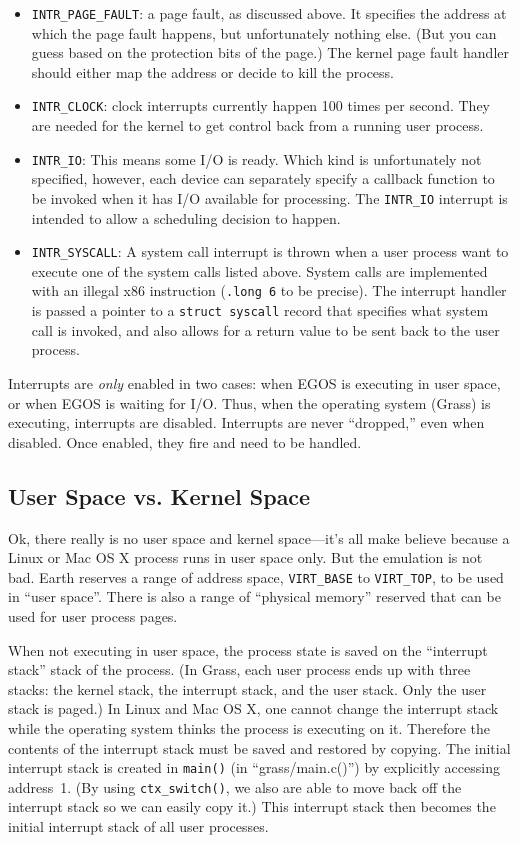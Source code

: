 \documentclass{article}
\begin{document}
\begin{itemize}
\item \texttt{INTR\_PAGE\_FAULT}: a page fault, as discussed above.
It specifies the address at which the page fault happens, but
unfortunately nothing else.  (But you can guess based on the protection
bits of the page.)  The kernel page fault handler should either
map the address or decide to kill the process.
\item \texttt{INTR\_CLOCK}: clock interrupts currently happen 100 times
per second.  They are needed for the kernel to get control back from
a running user process.
\item \texttt{INTR\_IO}:
This means some I/O is ready.  Which kind is unfortunately not specified,
however, each device can separately specify a callback function to be invoked
when it has I/O available for processing.  The \texttt{INTR\_IO} interrupt is
intended to allow a scheduling decision to happen.
\item \texttt{INTR\_SYSCALL}:
A system call interrupt is thrown when a user process want to execute
one of the system calls listed above.  System calls are implemented with
an illegal x86 instruction (\texttt{.long 6} to be precise).  The interrupt
handler is passed a pointer to a \texttt{struct syscall} record that
specifies what system call is invoked, and also allows for a return value
to be sent back to the user process.
\end{itemize}

Interrupts are \emph{only} enabled in two cases: when EGOS is executing
in user space, or when EGOS is waiting for I/O.  Thus, when the
operating system (Grass) is executing, interrupts are disabled.
Interrupts are never ``dropped,'' even when disabled.  Once enabled,
they fire and need to be handled.

\subsection{User Space vs. Kernel Space}

Ok, there really is no user space and kernel space---it's all make
believe because a Linux or Mac OS X process runs in user space only.
But the emulation is not bad.
Earth reserves a range of address space, \texttt{VIRT\_BASE} to
\texttt{VIRT\_TOP}, to be used in ``user space''.
There is also a range of ``physical memory'' reserved that can be
used for user process pages.

When not executing in user space, the process state is saved on the
``interrupt stack'' stack of the process.
(In Grass, each user process ends up with three stacks: the kernel
stack, the interrupt stack, and the user stack.  Only the user stack
is paged.)
In Linux and Mac OS X, one cannot change the interrupt stack while
the operating system thinks the process is executing on it.  Therefore
the contents of the interrupt stack must be saved and restored by
copying.
The initial interrupt stack is created in \texttt{main()}
(in ``grass/main.c()'') by explicitly accessing address~1.
(By using \texttt{ctx\_switch()}, we also are able to move back
off the interrupt stack so we can easily copy it.)
This interrupt stack then becomes the initial interrupt stack of
all user processes.
\end{document}
